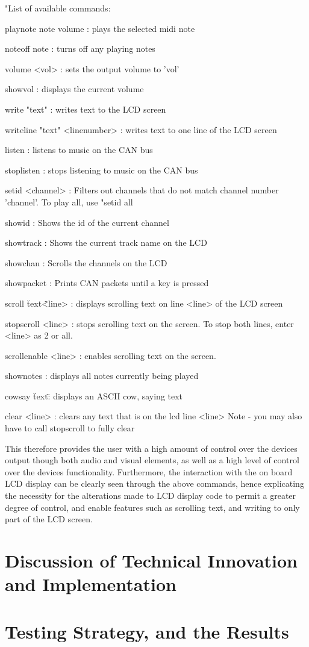 "List of available commands:\par\bigskip\noindent
playnote note volume   : plays the selected midi note\par\noindent
noteoff note           : turns off any playing notes\par\noindent
volume <vol>           : sets the output volume to 'vol'\par\noindent
showvol                : displays the current volume\par\noindent
write "text"           : writes text to the LCD screen\par\noindent
writeline "text" <linenumber> : writes text to one line of the 
LCD screen\par\noindent
listen                 : listens to music on the CAN bus\par\noindent
stoplisten             : stops listening to music on the CAN bus\par\noindent
setid <channel>        : Filters out channels that do not match 
channel number 'channel'. 
To play all, use "setid all\par\noindent
showid                 : Shows the id of the current channel\par\noindent
showtrack              : Shows the current track name on the LCD\par\noindent
showchan               : Scrolls the channels on the LCD\par\noindent
showpacket             : Prints CAN packets until a key is pressed\par\noindent
scroll \"text\" <line> : displays scrolling text on line <line> of the 
LCD screen\par\noindent
stopscroll <line>      : stops scrolling text on the screen. To stop both lines, 
enter <line> as 2 or all.\par\noindent
scrollenable <line>    : enables scrolling text on the screen.\par\noindent
shownotes              : displays all notes currently being played\par\noindent
cowsay \"text\"        : displays an ASCII cow, saying text\par\noindent
clear <line>           : clears any text that is on the lcd line <line> 
Note - you may also have to call stopscroll to fully clear\par\noindent
\par\bigskip\noindent
This therefore provides the user with a high amount of control over the devices 
output though both audio and visual elements, as well as a high level of control 
over the devices functionality. Furthermore, the interaction with 
the on board LCD display can be clearly seen through the above commands, hence 
explicating the necessity for the alterations made to LCD display code to permit 
a greater degree of control, and enable features such as scrolling text, and 
writing to only part of the LCD screen. 
\section{Discussion of Technical Innovation and Implementation}
\section{Testing Strategy, and the Results}
